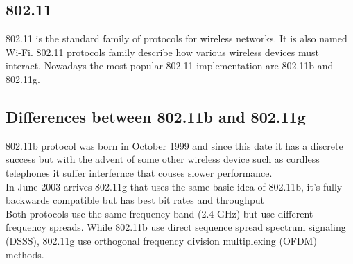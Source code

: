 	\subsection{802.11} \label{theory:prot_specs}
	802.11 is the standard family of protocols for wireless networks. It is also named Wi-Fi. 802.11 protocols family describe how various wireless devices must interact. Nowadays the most popular 802.11 implementation are 802.11b and 802.11g.
	
	\subsection{Differences between 802.11b and 802.11g} \label{theory:prot_differences}
	802.11b protocol was born in October 1999 and since this date it has a discrete success but with the advent of some other wireless device such as cordless telephones it suffer interfernce that couses slower performance.\\
	In June 2003 arrives 802.11g that uses the same basic idea of 802.11b, it's fully backwards compatible but has best bit rates and throughput\\
	Both protocols use the same frequency band (2.4 GHz) but use different frequency spreads. While 802.11b use direct sequence spread spectrum signaling (DSSS), 802.11g use orthogonal frequency division multiplexing (OFDM) methods.
	
		
